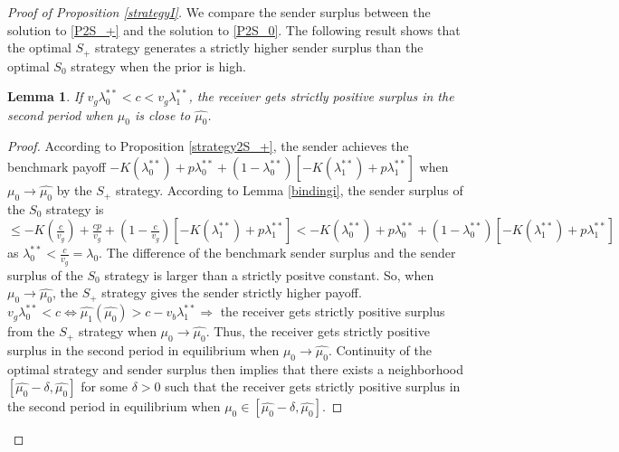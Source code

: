 \documentclass[11pt]{extarticle}
\newtheorem{lemma}{Lemma}
\newcommand{\lra}{\Leftrightarrow}
\newcommand{\ra}{\Rightarrow}
\begin{document}
\begin{proof}[Proof of Proposition \ref{strategyI}]
	
	We compare the sender surplus between the solution to \eqref{P2S_+} and the solution to \eqref{P2S_0}. The following result shows that the optimal $S_+$ strategy generates a strictly higher sender surplus than the optimal $S_0$ strategy when the prior is high.
	\begin{lemma}\label{ci+surplus}
		If $v_g\lambda_0^{**} < c < v_g\lambda_1^{**}$, the receiver gets strictly positive surplus in the second period when $\mu_0$ is close to $\widehat{\mu_0}$.
	\end{lemma}
	\begin{proof}
		According to Proposition \ref{strategy2S_+}, the sender achieves the benchmark payoff $-K(\lambda_0^{**}) + p \lambda_0^{**} + (1-\lambda_0^{**}) \left[-K(\lambda_1^{**})+p \lambda_1^{**}\right]$ when $\mu_0 \rightarrow \widehat{\mu_0}$ by the $S_+$ strategy. According to Lemma \ref{bindingi}, the sender surplus of the $S_0$ strategy is $\leq -K(\frac{c}{v_g}) + \frac{cp}{v_g} + (1-\frac{c}{v_g}) \left[-K(\lambda_1^{**})+p \lambda_1^{**}\right] < -K(\lambda_0^{**}) + p \lambda_0^{**} + (1-\lambda_0^{**}) \left[-K(\lambda_1^{**})+p \lambda_1^{**}\right]$ as $\lambda_0^{**} < \frac{c}{v_g} = \lambda_0$. The difference of the benchmark sender surplus and the sender surplus of the $S_0$ strategy is larger than a strictly positve constant. So, when $\mu_0 \rightarrow \widehat{\mu_0}$, the $S_+$ strategy gives the sender strictly higher payoff. $v_g\lambda_0^{**} < c \lra \widehat{\mu_1}(\widehat{\mu_0}) > c-v_b\lambda_1^{**} \ra$ the receiver gets strictly positive surplus from the $S_+$ strategy when $\mu_0 \rightarrow \widehat{\mu_0}$. Thus, the receiver gets strictly positive surplus in the second period in equilibrium when $\mu_0 \rightarrow \widehat{\mu_0}$. Continuity of the optimal strategy and sender surplus then implies that there exists a neighborhood $[\widehat{\mu_0}-\delta,\widehat{\mu_0}]$ for some $\delta > 0$ such that the receiver gets strictly positive surplus in the second period in equilibrium when $\mu_0\in [\widehat{\mu_0}-\delta,\widehat{\mu_0}]$.
	\end{proof}


\end{proof}
\end{document}
